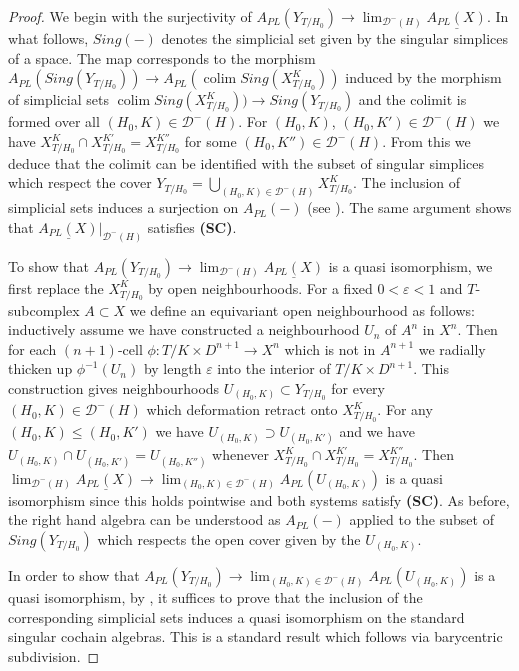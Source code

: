 \documentclass[12pt,a4paper]{article}
\theoremstyle{definition}
\DeclareMathOperator*{\colim}{colim}
\begin{document}
\begin{proof}
We begin with the surjectivity of $A_{PL}(Y_{T/H_0})\rightarrow \lim_{\mathcal{D}^-(H)} \underline{A_{PL}(X)}$. In what follows, $Sing(-)$ denotes the simplicial set given by the singular simplices of a space.
The map corresponds to the morphism $A_{PL}(Sing(Y_{T/H_0}))\rightarrow A_{PL}(\colim Sing(X_{T/H_0}^K))$ induced by the morphism of simplicial sets $\colim Sing(X_{T/H_0}^K))\rightarrow Sing(Y_{T/H_0})$ and the colimit is formed over all $(H_0,K)\in\mathcal{D}^-(H)$.  For $(H_0,K)$, $(H_0,K')\in\mathcal{D}^-(H)$ we have $X_{T/H_0}^K\cap X_{T/H_0}^{K'}=X_{T/H_0}^{K''}$ for some $(H_0,K'')\in\mathcal{D}^-(H)$.
From this we deduce that the colimit can be identified with the subset of singular simplices which respect the cover $Y_{T/H_0}=\bigcup_{(H_0,K)\in \mathcal{D}^-(H)} X_{T/H_0}^K$. The inclusion of simplicial sets induces a surjection on $A_{PL}(-)$ (see \cite[Proposition 10.4]{BibelI}). The same argument shows that $\underline{A_{PL}(X)}|_{\mathcal{D}^-(H)}$ satisfies \textbf{(SC)}.

To show that $A_{PL}(Y_{T/H_0})\rightarrow \lim_{\mathcal{D}^-(H)} \underline{A_{PL}(X)}$ is a quasi isomorphism, we first replace the $X_{T/H_0}^K$ by open neighbourhoods. For a fixed $0<\varepsilon<1$ and $T$-subcomplex $A\subset X$ we define an equivariant open neighbourhood as follows: inductively assume we have constructed a neighbourhood $U_n$ of $A^n$ in $X^n$. Then for each $(n+1)$-cell $\phi\colon T/K\times D^{n+1}\rightarrow X^n$ which is not in $A^{n+1}$ we radially thicken up $\phi^{-1}(U_n)$ by length $\varepsilon$ into the interior of $T/K\times D^{n+1}$. This construction gives neighbourhoods $U_{(H_0,K)}\subset Y_{T/H_0}$ for every $(H_0,K)\in\mathcal{D}^-(H)$ which deformation retract onto $X_{T/H_0}^K$. For any $(H_0,K)\leq (H_0,K')$ we have $U_{(H_0,K)}\supset U_{(H_0,K')}$ and  we have $U_{(H_0,K)}\cap U_{(H_0,K')}=U_{(H_0,K'')}$ whenever $X_{T/H_0}^K\cap X_{T/H_0}^{K'}=X_{T/H_0}^{K''}$. Then $\lim_{\mathcal{D}^-(H)} \underline{A_{PL}(X)}\rightarrow \lim_{(H_0,K)\in\mathcal{D}^-(H)} A_{PL}(U_{(H_0,K)})$ is a quasi isomorphism since this holds pointwise and both systems satisfy \textbf{(SC)}. As before, the right hand algebra can be understood as $A_{PL}(-)$ applied to the subset of $Sing(Y_{T/H_0})$ which respects the open cover given by the $U_{(H_0,K)}$.

In order to show that $A_{PL}(Y_{T/H_0})\rightarrow \lim_{(H_0,K)\in\mathcal{D}^-(H)} A_{PL}(U_{(H_0,K)})$ is a quasi isomorphism, by \cite[Theorem 10.9]{BibelI}, it suffices to prove that the inclusion of the corresponding simplicial sets induces a quasi isomorphism on the standard singular cochain algebras. This is a standard result which follows via barycentric subdivision.
\end{proof}
\end{document}
